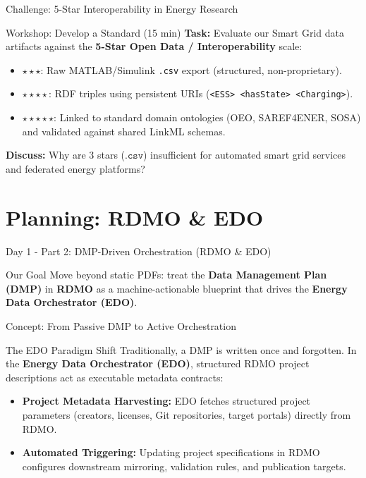 \documentclass[aspectratio=169]{beamer}
\let\pause\relax
\begin{document}
\begin{frame}{Challenge: 5-Star Interoperability in Energy Research}
    \begin{block}{Workshop: Develop a Standard (15 min)}
        \textbf{Task:} Evaluate our Smart Grid data artifacts against the \textbf{5-Star Open Data / Interoperability} scale:
        \begin{itemize}
            \item $\star\star\star$: Raw MATLAB/Simulink \texttt{.csv} export (structured, non-proprietary).
            \item $\star\star\star\star$: RDF triples using persistent URIs (\texttt{<ESS> <hasState> <Charging>}).
            \item $\star\star\star\star\star$: Linked to standard domain ontologies (OEO, SAREF4ENER, SOSA) and validated against shared LinkML schemas.
        \end{itemize}
        \pause
        \textbf{Discuss:} Why are 3 stars ($\texttt{.csv}$) insufficient for automated smart grid services and federated energy platforms?
    \end{block}
\end{frame}

\section{Planning: RDMO \& EDO}

\begin{frame}{Day 1 - Part 2: DMP-Driven Orchestration (RDMO \& EDO)}
    \begin{block}{Our Goal}
        Move beyond static PDFs: treat the \textbf{Data Management Plan (DMP)} in \textbf{RDMO} as a machine-actionable blueprint that drives the \textbf{Energy Data Orchestrator (EDO)}.
    \end{block}
\end{frame}

\begin{frame}{Concept: From Passive DMP to Active Orchestration}
    \begin{block}{The EDO Paradigm Shift}
        Traditionally, a DMP is written once and forgotten. In the \textbf{Energy Data Orchestrator (EDO)}, structured RDMO project descriptions act as executable metadata contracts:
    \end{block}
    \begin{itemize}
        \item \textbf{Project Metadata Harvesting:} EDO fetches structured project parameters (creators, licenses, Git repositories, target portals) directly from RDMO.
        \item \textbf{Automated Triggering:} Updating project specifications in RDMO configures downstream mirroring, validation rules, and publication targets.
    \end{itemize}
\end{frame}
\end{document}
